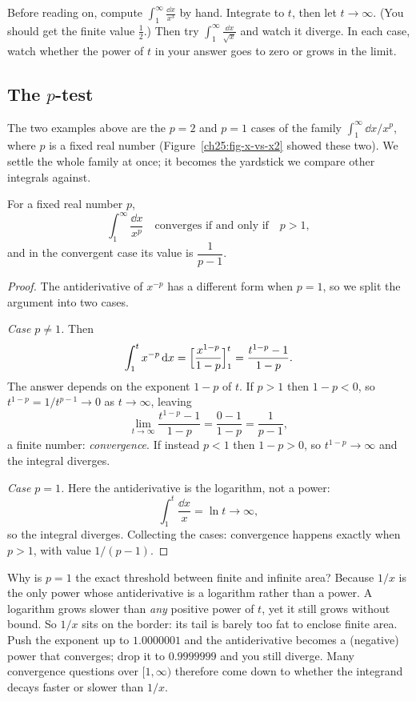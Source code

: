 \begin{labbox}
Before reading on, compute $\displaystyle\int_1^{\infty} \frac{\dd x}{x^{3}}$ by
hand. Integrate to $t$, then let $t\to\infty$. (You should get the finite value
$\tfrac12$.) Then try $\displaystyle\int_1^{\infty} \frac{\dd x}{\sqrt{x}}$ and
watch it diverge. In each case, watch whether the power of $t$ in your answer
goes to zero or grows in the limit.
\end{labbox}

\subsection{The $p$-test}
\label{ch25:p-test}

The two examples above are the $p=2$ and $p=1$ cases of the family
$\int_1^\infty \dd x/x^p$, where $p$ is a fixed real number (Figure~\ref{ch25:fig-x-vs-x2}
showed these two). We settle the whole family at once; it becomes the
yardstick we compare other integrals against.

\begin{theorem}
\label{ch25:thm-p-infinity}
For a fixed real number $p$,
\[
  \int_1^{\infty} \frac{\dd x}{x^{p}}
  \quad\text{converges if and only if}\quad p > 1,
\]
and in the convergent case its value is $\dfrac{1}{p-1}$.
\end{theorem}

\begin{proof}
The antiderivative of $x^{-p}$ has a different form when $p=1$, so we split the
argument into two cases.

\emph{Case $p \ne 1$.} Then
\[
  \int_1^{t} x^{-p}\,\mathrm{d} x
  = \Big[\frac{x^{1-p}}{1-p}\Big]_{1}^{t}
  = \frac{t^{1-p} - 1}{1-p}.
\]
The answer depends on the exponent $1-p$ of $t$. If $p > 1$ then $1-p < 0$, so
$t^{1-p} = 1/t^{p-1} \to 0$ as $t\to\infty$, leaving
\[
  \lim_{t\to\infty}\frac{t^{1-p}-1}{1-p} = \frac{0-1}{1-p} = \frac{1}{p-1},
\]
a finite number: \emph{convergence}. If instead $p < 1$ then $1-p > 0$, so
$t^{1-p}\to\infty$ and the integral diverges.

\emph{Case $p = 1$.} Here the antiderivative is the logarithm, not a power:
\[
  \int_1^{t}\frac{\dd x}{x} = \ln t \to \infty,
\]
so the integral diverges. Collecting the cases: convergence happens exactly when
$p > 1$, with value $1/(p-1)$.
\end{proof}

\begin{whybox}
Why is $p=1$ the exact threshold between finite and infinite area? Because
$1/x$ is the only power whose antiderivative is a logarithm rather than a power.
A logarithm grows slower than \emph{any} positive power of $t$, yet it still grows
without bound. So $1/x$ sits on the border: its tail is barely too fat to enclose
finite area. Push the exponent up to $1.0000001$ and the
antiderivative becomes a (negative) power that converges; drop it to $0.9999999$
and you still diverge. Many convergence questions over $[1,\infty)$ therefore come
down to whether the integrand decays faster or slower than $1/x$.
\end{whybox}

